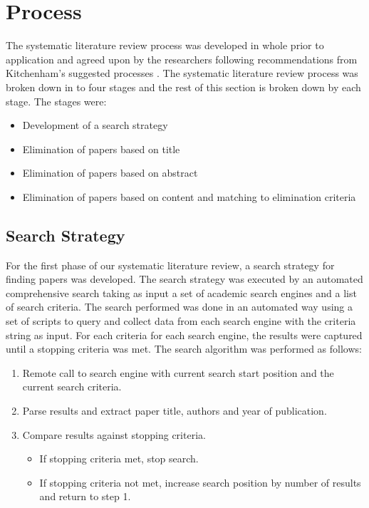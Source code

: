 \section{Process} \label{sec:process}

The systematic literature review process was developed in whole prior to application and agreed upon by the researchers following recommendations from Kitchenham's suggested processes \cite{kitchenham2007guidelines}.  The systematic literature review process was broken down in to four stages and the rest of this section is broken down by each stage.  The stages were:

\begin{itemize}
\item Development of a search strategy
\item Elimination of papers based on title
\item Elimination of papers based on abstract
\item Elimination of papers based on content and matching to elimination criteria
\end{itemize}

\subsection{Search Strategy}

For the first phase of our systematic literature review, a search strategy for finding papers was developed.  The search strategy was executed by an automated comprehensive search taking as input a set of academic search engines and a list of search criteria.  The search performed was done in an automated way using a set of scripts to query and collect data from each search engine with the criteria string as input.  For each criteria for each search engine, the results were captured until a stopping criteria was met.  The search algorithm was performed as follows:

\begin{enumerate}
\item Remote call to search engine with current search start position and the current search criteria.
\item Parse results and extract paper title, authors and year of publication.
\item Compare results against stopping criteria.
	\begin{itemize}
	\item If stopping criteria met, stop search.
	\item If stopping criteria not met, increase search position by number of results and return to step 1.
	\end{itemize}
\end{enumerate}


